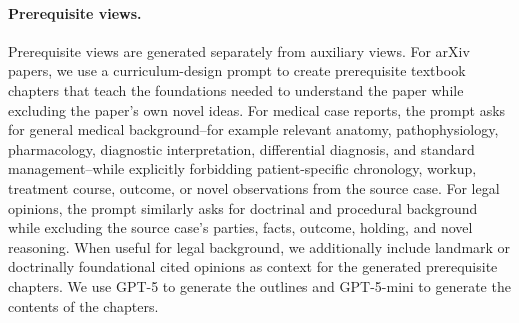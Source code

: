 \documentclass[11pt]{article}
\begin{document}
\paragraph{Prerequisite views.}
Prerequisite views are generated separately from auxiliary views.  For arXiv papers, we use a curriculum-design prompt to create prerequisite textbook chapters that teach the foundations needed to understand the paper while excluding the paper's own novel ideas.  For medical case reports, the prompt asks for general medical background--for example relevant anatomy, pathophysiology, pharmacology, diagnostic interpretation, differential diagnosis, and standard management--while explicitly forbidding patient-specific chronology, workup, treatment course, outcome, or novel observations from the source case.  For legal opinions, the prompt similarly asks for doctrinal and procedural background while excluding the source case's parties, facts, outcome, holding, and novel reasoning. When useful for legal background, we additionally include landmark or doctrinally foundational cited opinions as context for the generated prerequisite chapters. We use GPT-5 to generate the outlines and GPT-5-mini to generate the contents of the chapters.



\FloatBarrier
\end{document}
